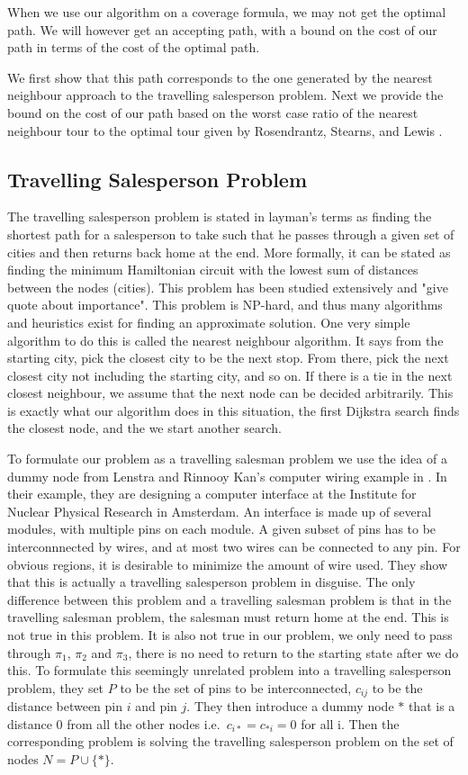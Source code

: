 When we use our algorithm on a coverage formula, we may not get the optimal path. We will however get an accepting path, with a bound on the cost of our path in terms of the cost of the optimal path. 

We first show that this path corresponds to the one generated by the nearest neighbour approach to the travelling salesperson problem. Next we provide the bound on the cost of our path based on the worst case ratio of the nearest neighbour tour to the optimal tour given by Rosendrantz, Stearns, and Lewis \cite{rosenkrantz74}. 

\subsection{Travelling Salesperson Problem}
The travelling salesperson problem is stated in layman's terms as finding the shortest path for a salesperson to take such that he passes through a given set of cities and then returns back home at the end. More formally, it can be stated as finding the minimum Hamiltonian circuit with the lowest sum of distances between the nodes (cities). This problem has been studied extensively and "give quote about importance". This problem is NP-hard, and thus many algorithms and heuristics exist for finding an approximate solution. One very simple algorithm to do this is called the nearest neighbour algorithm. It says from the starting city, pick the closest city to be the next stop. From there, pick the next closest city not including the starting city, and so on. If there is a tie in the next closest neighbour, we assume that the next node can be decided arbitrarily. This is exactly what our algorithm does in this situation, the first Dijkstra search finds the closest node, and the we start another search. 

To formulate our problem as a travelling salesman problem we use the idea of a dummy node from Lenstra and Rinnooy Kan's computer wiring example in \cite{lenstra75}. In their example, they are designing a computer interface at the Institute for Nuclear Physical Research in Amsterdam. An interface is made up of several modules, with multiple pins on each module. A given subset of pins has to be interconnnected by wires, and at most two wires can be connected to any pin. For obvious regions, it is desirable to minimize the amount of wire used. They show that this is actually a travelling salesperson problem in disguise. The only difference between this problem and a travelling salesman problem is that in the travelling salesman problem, the salesman must return home at the end. This is not true in this problem. It is also not true in our problem, we only need to pass through $\pi_1$, $\pi_2$ and $\pi_3$, there is no need to return to the starting state after we do this. To formulate this seemingly unrelated problem into a travelling salesperson problem, they set $P$ to be the set of pins to be interconnected, $c_{ij}$ to be the distance between pin $i$ and pin $j$. They then introduce a dummy node $*$ that is a distance 0 from all the other nodes i.e.\ $c_{i*} = c_{*i} = 0$ for all i. Then the corresponding problem is solving the travelling salesperson problem on the set of nodes $N=P \cup \{*\}$. 

